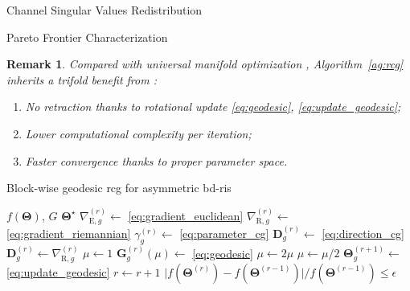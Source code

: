 \documentclass[journal]{IEEEtran}
\makeatletter
\newtheorem{remark}{Remark}
\newcommand\setalgorithmcaptionfont[1]{%
	\let\my@floatc@ruled\floatc@ruled          %
	\def\floatc@ruled{%
		\global\let\floatc@ruled\my@floatc@ruled %
		#1\floatc@ruled}}
\makeatother
\begin{document}
\begin{section}{Channel Singular Values Redistribution}
\begin{subsection}{Pareto Frontier Characterization}
		\begin{remark}
			Compared with universal manifold optimization \cite{Absil2009,Pan2022d}, Algorithm~\ref{ag:rcg} inherits a trifold benefit from \cite{Abrudan2008,Abrudan2009}:
			\begin{enumerate}
				\item No retraction thanks to rotational update \eqref{eq:geodesic}, \eqref{eq:update_geodesic};
				\item Lower computational complexity per iteration;
				\item Faster convergence thanks to proper parameter space.
			\end{enumerate}
		\end{remark}

		\setalgorithmcaptionfont{\small}
		\begin{algorithm}[!t]
			\small
			\caption{Block-wise geodesic \gls{rcg} for asymmetric \gls{bd}-\gls{ris}}
			\label{ag:rcg}
			\begin{algorithmic}[1]
				\Require $f(\mathbf{\Theta})$, $G$
				\Ensure $\mathbf{\Theta}^\star$
				\Repeat
						\State $\nabla_{\mathrm{E},g}^{(r)} \gets$ \eqref{eq:gradient_euclidean} \label{ln:gradient_euclidean}
						\State $\nabla_{\mathrm{R},g}^{(r)} \gets$ \eqref{eq:gradient_riemannian}
						\State $\gamma_g^{(r)} \gets$ \eqref{eq:parameter_cg}
						\State $\mathbf{D}_g^{(r)} \gets$ \eqref{eq:direction_cg}
						 
							\State $\mathbf{D}_g^{(r)} \gets \nabla_{\mathrm{R},g}^{(r)}$
						\EndIf
						\State $\mu \gets 1$
						\State $\mathbf{G}_g^{(r)}(\mu) \gets$ \eqref{eq:geodesic}
							\State $\mu \gets 2 \mu$
						\EndWhile
							\State $\mu \gets \mu / 2$
						\EndWhile
						\State $\mathbf{\Theta}_g^{(r+1)} \gets$ \eqref{eq:update_geodesic}
					\EndFor
					\State $r \gets r+1$
				\Until $\lvert f(\mathbf{\Theta}^{(r)}) - f(\mathbf{\Theta}^{(r-1)}) \rvert / f(\mathbf{\Theta}^{(r-1)}) \le \epsilon$
			\end{algorithmic}
		\end{algorithm}


\end{subsection}
\end{section}
\end{document}
